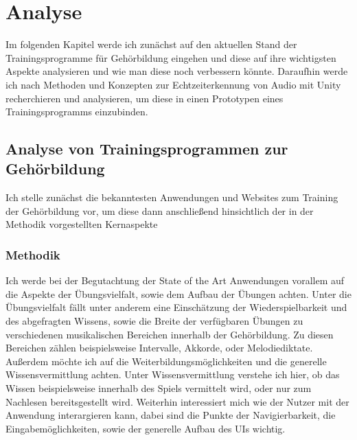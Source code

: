\chapter{Analyse}

%
%
Im folgenden Kapitel werde ich zunächst auf den aktuellen Stand der Trainingsprogramme für Gehörbildung eingehen und diese auf ihre wichtigsten Aspekte analysieren und wie man diese noch verbessern könnte. Daraufhin werde ich nach Methoden und Konzepten zur Echtzeiterkennung von Audio mit Unity recherchieren und analysieren, um diese in einen Prototypen eines Trainingsprogramms einzubinden.

\section{Analyse von Trainingsprogrammen zur Gehörbildung}
Ich stelle zunächst die bekanntesten Anwendungen und Websites zum Training der Gehörbildung vor, um diese dann anschließend hinsichtlich der in der Methodik vorgestellten Kernaspekte
\subsection{Methodik}
%

Ich werde bei der Begutachtung der State of the Art Anwendungen vorallem auf die Aspekte der Übungsvielfalt, sowie dem Aufbau der Übungen achten. Unter die Übungsvielfalt fällt unter anderem eine Einschätzung der Wiederspielbarkeit und des abgefragten Wissens, sowie die Breite der verfügbaren Übungen zu verschiedenen musikalischen Bereichen innerhalb der Gehörbildung. Zu diesen Bereichen zählen beispielsweise Intervalle, Akkorde, oder Melodiediktate.
Außerdem möchte ich auf die Weiterbildungsmöglichkeiten und die generelle Wissensvermittlung achten. Unter Wissensvermittlung verstehe ich hier, ob das Wissen beispielsweise innerhalb des Spiels vermittelt wird, oder nur zum Nachlesen bereitsgestellt wird. 
Weiterhin interessiert mich wie der Nutzer mit der Anwendung interargieren kann, dabei sind die Punkte der Navigierbarkeit, die Eingabemöglichkeiten, sowie der generelle Aufbau des UIs wichtig. 

